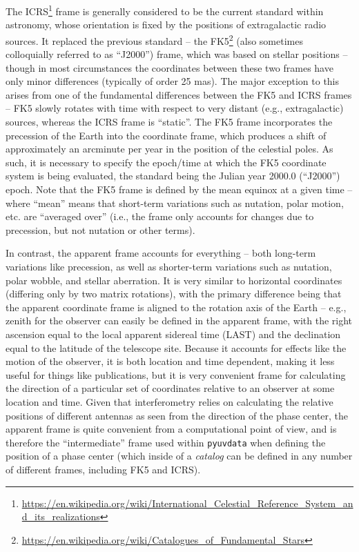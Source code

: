 \documentclass[11pt, oneside]{article}
\begin{document}
The ICRS\footnote{\url{https://en.wikipedia.org/wiki/International_Celestial_Reference_System_and_its_realizations}} frame is generally considered to be the current standard within astronomy, whose orientation is fixed by the positions of extragalactic radio sources. It replaced the previous standard -- the FK5\footnote{\url{https://en.wikipedia.org/wiki/Catalogues_of_Fundamental_Stars}} (also sometimes colloquially referred to as ``J2000'') frame, which was based on stellar positions -- though in most circumstances the coordinates between these two frames have only minor differences (typically of order 25 mas). The major exception to this arises from one of the fundamental differences between the FK5 and ICRS frames -- FK5 slowly rotates with time with respect to very distant (e.g., extragalactic) sources, whereas the ICRS frame is ``static''. The FK5 frame incorporates the precession of the Earth into the coordinate frame, which produces a shift of approximately an arcminute per year in the position of the celestial poles. As such, it is necessary to specify the epoch/time at which the FK5 coordinate system is being evaluated, the standard being the Julian year 2000.0 (``J2000'') epoch. Note that the FK5 frame is defined by the mean equinox at a given time -- where ``mean'' means that short-term variations such as nutation, polar motion, etc. are ``averaged over'' (i.e., the frame only accounts for changes due to precession, but not nutation or other terms).

In contrast, the apparent frame accounts for everything -- both long-term variations like precession, as well as shorter-term variations such as nutation, polar wobble, and stellar aberration. It is very similar to horizontal coordinates (differing only by two matrix rotations), with the primary difference being that the apparent coordinate frame is aligned to the rotation axis of the Earth  -- e.g., zenith for the observer can easily be defined in the apparent frame, with the right ascension equal to the local apparent sidereal time (LAST) and the declination equal to the latitude of the telescope site. Because it accounts for effects like the motion of the observer, it is both location and time dependent, making it less useful for things like publications, but it is very convenient frame for calculating the direction of a particular set of coordinates relative to an observer at some location and time. Given that interferometry relies on calculating the relative positions of different antennas as seen from the direction of the phase center, the apparent frame is quite convenient from a computational point of view, and is therefore the ``intermediate'' frame used within \texttt{pyuvdata} when defining the position of a phase center (which inside of a \emph{catalog} can be defined in any number of different frames, including FK5 and ICRS).
\end{document}
